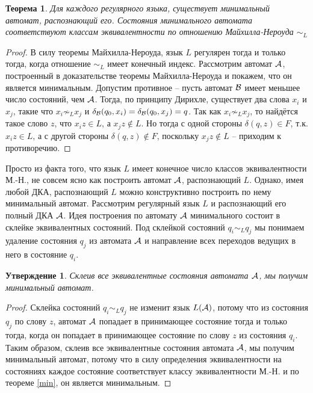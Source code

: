 \documentclass[12pt]{article}
\theoremstyle{definiton}
\newtheorem{Claim}{Утверждение}
\newtheorem{Theorem}{Теорема}
\theoremstyle{definition}
\theoremstyle{definition}
\def\A{{\cal A}}
\def\B{{\cal B}}
\begin{document}
\begin{Theorem}\label{min-auto}
	Для каждого регулярного языка, существует минимальный автомат, распознающий его. Состояния минимального автомата соответствуют классам эквивалентности по отношению Майхилла-Нероуда $\sim_L$ 
\end{Theorem}
\begin{proof}
	В силу теоремы Майхилла-Нероуда, язык $L$ регулярен тогда и только тогда, когда отношение $\sim_L$ имеет конечный индекс. Рассмотрим автомат $\A$, построенный в доказательстве теоремы Майхилла-Нероуда и покажем, что он является минимальным. Допустим противное -- пусть автомат $\B$ имеет меньшее число состояний, чем $\A$. Тогда, по принципу Дирихле, существует два слова $x_i$ и $x_j$, такие что $x_i \not\sim_L x_j $ и $\delta_{\B}(q_0, x_i) = \delta_{\B}(q_0, x_j) = q$. Так как $x_i \not\sim_L x_j $, то найдётся такое слово $z$, что $x_iz \in L$, а $x_jz \not\in L$. Но тогда с одной стороны $\delta(q, z) \in F$, т.к. $x_iz \in L$, а с другой стороны $\delta(q, z) \not\in F$, поскольку $x_jz \not\in L$ -- приходим к противоречию.
\end{proof}


Просто из факта того, что язык $L$ имеет конечное число классов эквивалентности М.-Н., не совсем ясно как построить автомат $\A$, распознающий $L$. Однако, имея любой ДКА, распознающий $L$ можно конструктивно построить по нему минимальный автомат. 
Рассмотрим регулярный язык $L$ и распознающий его полный ДКА $\A$. Идея построения по автомату $\A$ минимального состоит в склейке эквивалентных состояний. Под склейкой состояний $q_i \sim_L q_j$ мы понимаем удаление состояния $q_j$  из автомата $\A$ и направление всех переходов ведущих в него в состояние $q_i$.

\begin{Claim}
	Склеив все эквивалентные состояния автомата $\A$, мы получим минимальный автомат.
\end{Claim}
\begin{proof}
	Склейка состояний $q_i \sim_L q_j$ не изменит язык $L(\A)$, потому что из состояния $q_j$ по слову $z$, автомат $\A$ попадает в принимающее состояние тогда и только тогда, когда он попадает в принимающее состояние по слову $z$ из состояния $q_i$. Таким образом, склеив все эквивалентные состояния автомата $\A$, мы получим минимальный автомат, потому что в силу определения эквивалентности на состояниях каждое состояние соответствует классу эквивалентности М.-Н. и по теореме \ref{min}, он является минимальным. 
\end{proof}
\end{document}
